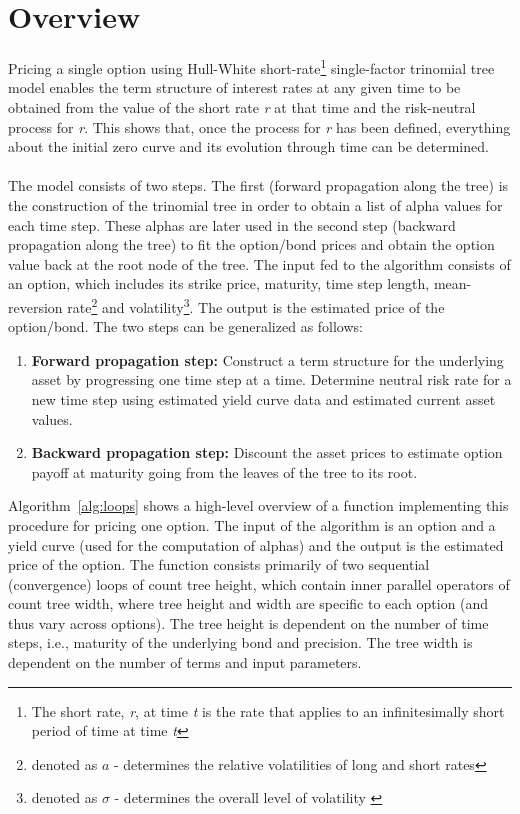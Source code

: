 \section{Overview}
Pricing a single option using Hull-White short-rate\footnote{The short rate, \textit{r}, at time \textit{t} is the rate that applies to an infinitesimally short period of time at time \textit{t}\cite[pg. 682]{ofod}} single-factor trinomial tree model enables the term structure of interest rates at any given time to be obtained from the value of the short rate \textit{r} at that time and the risk-neutral process for \textit{r}. This shows that, once the process for \textit{r} has been defined, everything about the initial zero curve and its evolution through time can be determined\cite[pg. 683]{ofod}. 
\\\\
The model consists of two steps. The first (forward propagation along the tree) is the construction of the trinomial tree in order to obtain a list of alpha values for each time step. These alphas are later used in the second step (backward propagation along the tree) to fit the option/bond prices and obtain the option value back at the root node of the tree. The input fed to the algorithm consists of an option, which includes its strike price, maturity, time step length, mean-reversion rate\footnote{denoted as $a$ - determines the relative volatilities of long and short rates\cite[pg.9]{npfits}} and volatility\footnote{denoted as $\sigma$ - determines the overall level of volatility \cite[pg. 9]{npfits}}. The output is the estimated price of the option/bond. The two steps can be generalized as follows: 

\begin{enumerate}
    \item \textbf{Forward propagation step:} Construct a term structure for the underlying asset by progressing one time step at a time. Determine neutral risk rate for a new time step using estimated yield curve data and estimated current asset values.
    \item \textbf{Backward propagation step:} Discount the asset prices to estimate option payoff at maturity going from the leaves of the tree to its root. 
\end{enumerate}

Algorithm~\ref{alg:loops} shows a high-level overview of a function implementing this procedure for pricing one option. The input of the algorithm is an option and a yield curve (used for the computation of alphas) and the output is the estimated price of the option. The function consists primarily of two sequential (convergence) loops of count tree height, which contain inner parallel operators of count tree width, where tree height and width are specific to each option (and thus vary across options). The tree height is dependent on the number of time steps, i.e., maturity of the underlying bond and precision. The tree width is dependent on the number of terms and input parameters.

